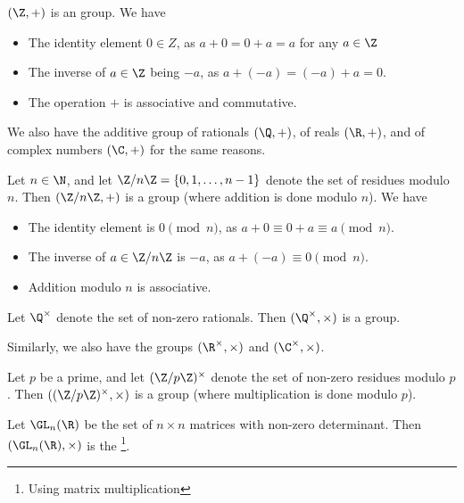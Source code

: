 \documentclass[a4]{scrreprt}
\begin{document}
\begin{example}
	$(\Z, +)$ is an group. We have
	\begin{itemize}
		\item The identity element $0 \in Z$, as $a + 0 = 0 + a = a$ for any $a \in \Z$
		\item The inverse of $a \in \Z$ being $-a$, as $a + (-a) = (-a) + a = 0$. 
		\item The operation $+$ is associative and commutative.
	\end{itemize}
\end{example}
We also have the additive group of rationals $(\Q, +)$, of reals $(\R, +)$, and of complex numbers $(\C, +)$ for the same reasons.

\begin{example}
	Let $n \in \N$, and let $\Z/n \Z = \{0, 1, \dots, n - 1\}$ denote the set of residues modulo $n$. Then $(\Z/n\Z, +)$ is a group (where addition is done modulo $n$). We have
	\begin{itemize}
		\item The identity element is $0 \pmod{n}$, as $a + 0 \equiv 0 + a \equiv a \pmod{n}$.
		\item The inverse of $a \in \Z/n\Z$ is $-a$, as $a + (-a) \equiv 0 \pmod{n}$.
		\item Addition modulo $n$ is associative.
	\end{itemize}
\end{example}

\begin{example}
	Let $\Q^\times$ denote the set of non-zero rationals. Then $(\Q^\times, \times)$ is a group.
\end{example}
Similarly, we also have the groups $(\R^\times, \times)$ and $(\C^\times, \times)$.

\begin{example}
	Let $p$ be a prime, and let $(\Z / p \Z)^\times$ denote the set of non-zero residues modulo $p$. Then $((\Z / p \Z)^\times, \times)$ is a group (where multiplication is done modulo $p$).
\end{example}

\begin{example}
	Let $\GL_n(\R)$ be the set of $n \times n$ matrices with non-zero determinant. Then $(\GL_n(\R), \times)$ is the \footnote{Using matrix multiplication}.
\end{example}
\end{document}

